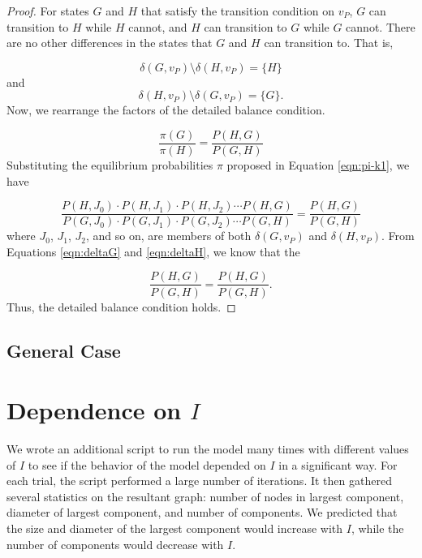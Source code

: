 \documentclass[a4paper,10pt]{article}
\begin{document}
\begin{proof}
For states $G$ and $H$ that satisfy the transition condition on $v_P$, $G$ can transition to $H$ while $H$ cannot, and $H$ can transition to $G$ while $G$ cannot. There are no other differences in the states that $G$ and $H$ can transition to. That is,

\begin{equation}
\label{eqn:deltaG}
 \delta(G, v_P) \setminus \delta(H, v_P) = \{H\}
\end{equation}
and
\begin{equation}
\label{eqn:deltaH}
 \delta(H, v_P) \setminus \delta(G, v_P) = \{G\}.
\end{equation}
Now, we rearrange the factors of the detailed balance condition. 

\begin{equation}
 \frac{\pi(G)}{\pi(H)} = \frac{P(H, G)}{P(G, H)}
\end{equation}
Substituting the equilibrium probabilities $\pi$ proposed in Equation \ref{eqn:pi-k1}, we have

\begin{equation}
 \frac{P(H, J_0) \cdot P(H, J_1) \cdot P(H, J_2) \cdots P(H, G)}
{P(G, J_0) \cdot P(G, J_1) \cdot P(G, J_2) \cdots P(G, H)} = 
\frac{P(H, G)}{P(G, H)}
\end{equation}
where $J_0$, $J_1$, $J_2$, and so on, are members of both $\delta(G, v_P)$ and $\delta(H, v_P)$. From Equations \ref{eqn:deltaG} and \ref{eqn:deltaH}, we know that the 

\begin{equation}
 \frac{P(H, G)}{P(G, H)} = \frac{P(H, G)}{P(G, H)}.
\end{equation}
Thus, the detailed balance condition holds.
\end{proof}

\subsection{General Case}

\section{Dependence on $I$}

We wrote an additional script to run the model many times with different values of $I$ to see if the behavior of the model depended on $I$ in a significant way. For each trial, the script performed a large number of iterations. It then gathered several statistics on the resultant graph: number of nodes in largest component, diameter of largest component, and number of components. We predicted that the size and diameter of the largest component would increase with $I$, while the number of components would decrease with $I$. 
\end{document}
